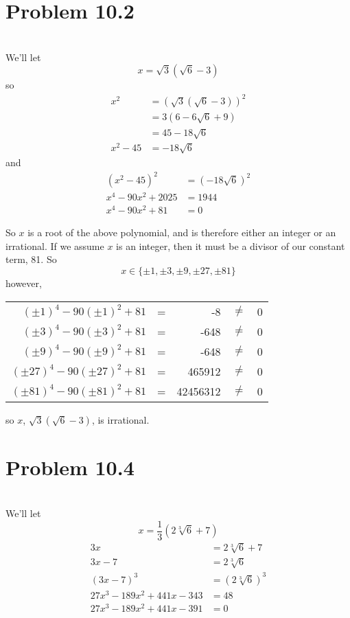 \documentclass[12pt]{article}
\begin{document}
\section*{Problem 10.2}
\\

We'll let
\[x = \sqrt{3}(\sqrt{6}-3)\]
so
\begin{align*}
    x^2 &= (\sqrt{3}(\sqrt{6}-3))^2 \\
        &= 3(6 - 6\sqrt{6} + 9) \\
        &= 45 - 18\sqrt{6} \\
    x^2 - 45 &= -18\sqrt{6}
\end{align*}
and
\begin{align*}
    (x^2 - 45)^2 &=  (-18\sqrt{6})^2 \\
    x^4 -90x^2 + 2025 &= 1944 \\
    x^4 -90x^2 + 81 &= 0
\end{align*}

So $x$ is a root of the above polynomial, and is therefore either an integer or an irrational. If we assume $x$ is an integer, then it must be a divisor of our constant term, 81. So
\[x \in \{\pm1, \pm3, \pm9, \pm27, \pm81\}\]
however,
\begin{center}
    \begin{tabular}{r c r c l}
        $(\pm1)^4 -90(\pm1)^2 + 81$ & = & -8 & $\ne$ & 0\\
        $(\pm3)^4 -90(\pm3)^2 + 81$ & = & -648 & $\ne$ & 0\\
        $(\pm9)^4 -90(\pm9)^2 + 81$ & = & -648 & $\ne$ & 0\\
        $(\pm27)^4 -90(\pm27)^2 + 81$ & = & 465912 & $\ne$ & 0\\
        $(\pm81)^4 -90(\pm81)^2 + 81$ & = & 42456312 & $\ne$ & 0\\
    \end{tabular}
\end{center}
so $x$, $\sqrt{3}(\sqrt{6}-3)$, is irrational.

\newpage
\section*{Problem 10.4}
\\

We'll let
\[x = \frac{1}{3}(2\sqrt[3]{6}+7)\]
\begin{align*}
    3x &= 2\sqrt[3]{6} + 7 \\
    3x - 7 &= 2\sqrt[3]{6} \\
    (3x-7)^3 &= (2\sqrt[3]{6})^3 \\
    27x^3 - 189x^2 + 441x - 343 &= 48 \\
    27x^3 - 189x^2 + 441x - 391 &= 0
\end{align*}
\end{document}
